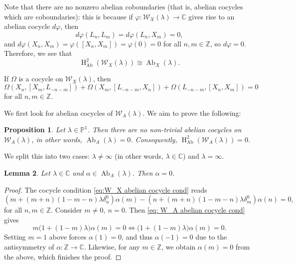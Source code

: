 \documentclass[11pt, svgnames]{amsart}
\newcommand{\ZZ}{\mathbb{Z}}
\newcommand{\CC}{\mathbb{C}}
\newcommand{\PP}{\mathbb{P}}
\newcommand{\W}{\mathcal{W}}
\DeclareMathOperator{\HH}{H}
\DeclareMathOperator{\Ab}{Ab}
\newtheorem{proposition}{Proposition}[section]
\newtheorem{lemma}[proposition]{Lemma}
\theoremstyle{definition}
\begin{document}
Note that there are no nonzero abelian coboundaries (that is, abelian cocycles which are coboundaries): this is because if $\varphi \colon \W_X(\lambda) \to \CC$ gives rise to an abelian cocycle $d\varphi$, then
$$d\varphi(L_n,L_m) = d\varphi(L_n,X_m) = 0,$$
and $d\varphi(X_n,X_m) = \varphi([X_n,X_m]) = \varphi(0) = 0$ for all $n,m \in \ZZ$, so $d\varphi = 0$. Therefore, we see that
$$\HH_{\Ab}^2(\W_X(\lambda)) \cong \Ab_X(\lambda).$$

If $\Omega$ is a cocycle on $\W_X(\lambda)$, then
\begin{equation}\label{eq:W_X abelian cocycle cond}
    \Omega(X_n,[X_m,L_{-n-m}]) + \Omega(X_m,[L_{-n-m},X_n]) + \Omega(L_{-n-m},[X_n,X_m]) = 0
\end{equation}
for all $n,m \in \ZZ$.

We first look for abelian cocycles of $\W_A (\lambda)$. We aim to prove the following:

\begin{proposition}\label{prop:W_A has no abelian cocycles}
    Let $\lambda \in \PP^1$. Then there are no non-trivial abelian cocycles on $\W_A(\lambda)$, in other words, $\Ab_A(\lambda) = 0$. Consequently, $\HH_{\Ab}^2(\W_A(\lambda)) = 0$.
\end{proposition}

We split this into two cases: $\lambda\neq\infty$ (in other words, $\lambda\in\mathbb{C}$) and $\lambda=\infty$.

\begin{lemma}
    Let $\lambda \in \CC$ and $\alpha \in \Ab_A(\lambda)$. Then $\alpha = 0$.
\end{lemma}
\begin{proof}
    The cocycle condition \eqref{eq:W_X abelian cocycle cond} reads
    \begin{equation}
    \label{eq: W_A abelian cocycle cond}
        (m + (m + n)(1 - m - n) \lambda \delta^0_n) \alpha(m) - (n + (m + n)(1 - m - n) \lambda \delta^0_m) \alpha(n) = 0,
    \end{equation}
    for all $n,m \in \ZZ$. Consider $m\neq 0,\ n=0$. Then \eqref{eq: W_A abelian cocycle cond} gives
    \begin{equation}
        m\big(1+(1-m)\lambda\big)\alpha(m) = 0 \iff (1+(1-m)\lambda\big)\alpha(m) = 0.
    \end{equation}
    Setting $m=1$ above forces $\alpha(1)=0$, and thus $\alpha(-1)=0$ due to the antisymmetry of $\alpha: \ZZ \rightarrow \CC$. Likewise, for any $m\in\mathbb{Z}$, we obtain $\alpha(m)=0$ from the above, which finishes the proof.
\end{proof}
\end{document}
